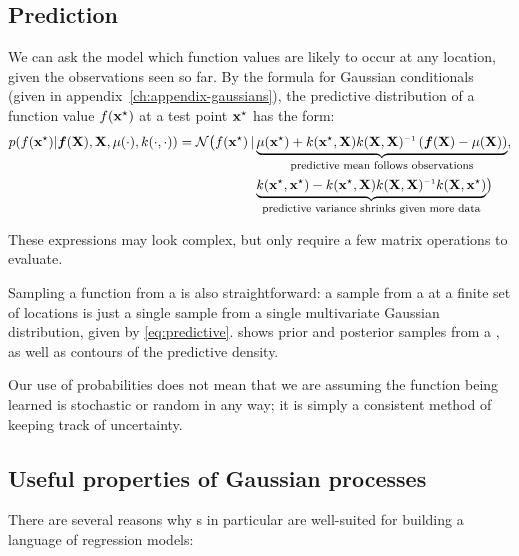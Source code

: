 \subsection{Prediction}
We can ask the model which function values are likely to occur at any location, given the observations seen so far.
By the formula for Gaussian conditionals (given in appendix~\ref{ch:appendix-gaussians}), the predictive distribution of a function value $f({\bf{x}}^\star)$ at a test point ${{\bf{x}}^\star}$ has the form:
%
\begin{align}
p( f(\testpoint) | \funcval, \vX, \mu(\cdot), k(\cdot, \cdot))
 = \mathcal{N} \big( f(\testpoint) \given & \underwrite{\mu(\testpoint) + k(\testpoint, \vX) k(\vX, \vX)\inv \left( \funcval - \mu(\vX) \right) }{\footnotesize predictive mean follows observations}, \nonumber \\
 & \underwrite{k(\testpoint, \testpoint) - k(\testpoint, \vX) k(\vX, \vX)\inv k(\vX, \testpoint)}{\footnotesize predictive variance shrinks given more data}
 \big)
\label{eq:predictive}
\end{align}

These expressions may look complex, but only require a few matrix operations to evaluate.

Sampling a function from a \gp{} is also straightforward: a sample from a \gp{} at a finite set of locations is just a single sample from a single multivariate Gaussian distribution, given by \cref{eq:predictive}.
 shows prior and posterior samples from a \gp{}, as well as contours of the predictive density.

Our use of probabilities does not mean that we are assuming the function being learned is stochastic or random in any way; it is simply a consistent method of keeping track of uncertainty.



\subsection{Useful properties of Gaussian processes}
\label{sec:useful-properties}

There are several reasons why \gp{}s in particular are well-suited for building a language of regression models:

